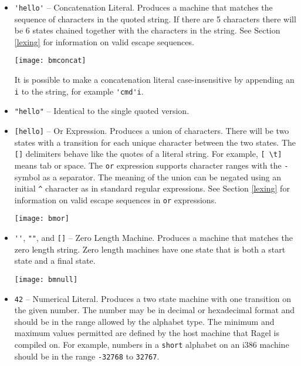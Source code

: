 \documentclass[letterpaper,11pt,oneside]{book}
\newcommand{\graphspace}{\vspace{10pt}}
\begin{document}
\begin{itemize}

\item \verb|'hello'| -- Concatenation Literal. Produces a machine that matches
the sequence of characters in the quoted string. If there are 5 characters
there will be 6 states chained together with the characters in the string. See
Section \ref{lexing} for information on valid escape sequences. 


\graphspace
\begin{center}
\texttt{[image: bmconcat]}
\end{center}
\graphspace

It is possible
to make a concatenation literal case-insensitive by appending an \verb|i| to
the string, for example \verb|'cmd'i|.

\item \verb|"hello"| -- Identical to the single quoted version.

\item \verb|[hello]| -- Or Expression. Produces a union of characters.  There
will be two states with a transition for each unique character between the two states.
The \verb|[]| delimiters behave like the quotes of a literal string. For example, 
\verb|[ \t]| means tab or space. The \verb|or| expression supports character ranges
with the \verb|-| symbol as a separator. The meaning of the union can be negated
using an initial \verb|^| character as in standard regular expressions. 
See Section \ref{lexing} for information on valid escape sequences
in \verb|or| expressions.


\graphspace
\begin{center}
\texttt{[image: bmor]}
\end{center}
\graphspace

\item \verb|''|, \verb|""|, and \verb|[]| -- Zero Length Machine.  Produces a machine
that matches the zero length string. Zero length machines have one state that is both
a start state and a final state.


\graphspace
\begin{center}
\texttt{[image: bmnull]}
\end{center}
\graphspace

\item \verb|42| -- Numerical Literal. Produces a two state machine with one
transition on the given number. The number may be in decimal or hexadecimal
format and should be in the range allowed by the alphabet type. The minimum and
maximum values permitted are defined by the host machine that Ragel is compiled
on. For example, numbers in a \verb|short| alphabet on an i386 machine should
be in the range \verb|-32768| to \verb|32767|.



\end{itemize}
\end{document}

